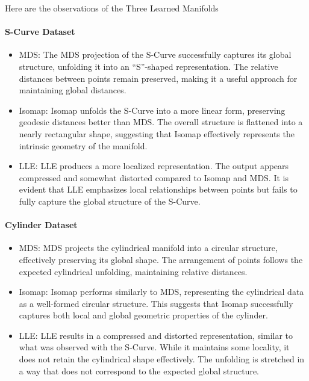 \documentclass[11pt]{scrartcl}
\begin{document}
Here are the observations of the Three Learned Manifolds

\paragraph{S-Curve Dataset}
\begin{itemize}
    \item MDS: The MDS projection of the S-Curve successfully captures its global structure, unfolding it into an ``S''-shaped representation. The relative distances between points remain preserved, making it a useful approach for maintaining global distances.
    \item Isomap: Isomap unfolds the S-Curve into a more linear form, preserving geodesic distances better than MDS. The overall structure is flattened into a nearly rectangular shape, suggesting that Isomap effectively represents the intrinsic geometry of the manifold.
    \item LLE: LLE produces a more localized representation. The output appears compressed and somewhat distorted compared to Isomap and MDS. It is evident that LLE emphasizes local relationships between points but fails to fully capture the global structure of the S-Curve.
\end{itemize}

\paragraph{Cylinder Dataset}

\begin{itemize}
    \item MDS: MDS projects the cylindrical manifold into a circular structure, effectively preserving its global shape. The arrangement of points follows the expected cylindrical unfolding, maintaining relative distances.
    \item Isomap: Isomap performs similarly to MDS, representing the cylindrical data as a well-formed circular structure. This suggests that Isomap successfully captures both local and global geometric properties of the cylinder.
    \item LLE: LLE results in a compressed and distorted representation, similar to what was observed with the S-Curve. While it maintains some locality, it does not retain the cylindrical shape effectively. The unfolding is stretched in a way that does not correspond to the expected global structure.
\end{itemize}
\end{document}
